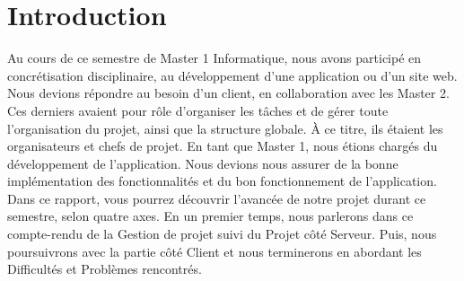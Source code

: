 \chapter*{Introduction}

Au cours de ce semestre de Master 1 Informatique, nous avons participé en concrétisation disciplinaire, au développement d'une application ou d'un site web. Nous devions répondre au besoin d'un client, en collaboration avec les Master 2. Ces derniers avaient pour rôle d'organiser les tâches et de gérer toute l'organisation du projet, ainsi que la structure globale. À ce titre, ils étaient les organisateurs et chefs de projet.
En tant que Master 1, nous étions chargés du développement de l'application. Nous devions nous assurer de la bonne implémentation des fonctionnalités et du bon fonctionnement de l'application.
Dans ce rapport, vous pourrez découvrir l'avancée de notre projet durant ce semestre, selon quatre axes. En un premier temps, nous parlerons dans ce compte-rendu de la Gestion de projet suivi du Projet côté Serveur. Puis, nous poursuivrons avec la partie côté Client et nous terminerons en abordant les Difficultés et Problèmes rencontrés.



